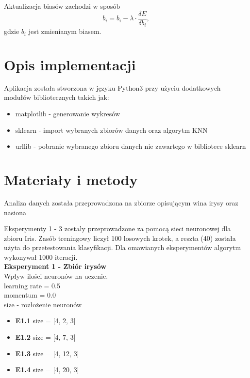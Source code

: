 \documentclass{classrep}
\begin{document}
Aktualizacja biasów zachodzi w sposób
\begin{equation} \label{eq:generalBackPropagationBias}
	b_i = b_i - \lambda \cdot \frac{\delta E}{\delta b_i},
\end{equation}
gdzie $b_i$ jest zmienianym biasem.

\section{Opis implementacji}
Aplikacja została stworzona w języku Python3 przy użyciu dodatkowych modułów bibliotecznych takich jak:
		\begin{itemize}
			\item matplotlib - generowanie wykresów
			\item sklearn - import wybranych zbiorów danych oraz algorytm KNN
			\item urllib - pobranie wybranego zbioru danych nie zawartego w bibliotece sklearn
		\end{itemize}

\section{Materiały i metody}
Analiza danych została przeprowadzona na zbiorze opisującym wina irysy \cite{irisdataset} oraz nasiona \cite{seedsdataset}


Eksperymenty 1 - 3 zostały przeprowadzone za pomocą sieci neuronowej dla zbioru Iris. Zasób treningowy liczył 100 losowych krotek, a reszta (40) została użyta do przetestowania klasyfikacji. Dla omawianych eksperymentów algorytm wykonywał 1000 iteracji.\\


\textbf{Eksperyment 1 - Zbiór irysów}\\
		Wpływ ilości neuronów na uczenie.\\
		learning rate = 0.5\\
		momentum = 0.0\\
		size - rozłożenie neuronów
		\begin{itemize}
			\item \textbf{E1.1}
			 size = [4, 2, 3]
			\item \textbf{E1.2} 
			size = [4, 7, 3]
			\item \textbf{E1.3}
			size = [4, 12, 3]
			\item \textbf{E1.4}
			size = [4, 20, 3]\\
		\end{itemize}
	
\end{document}
